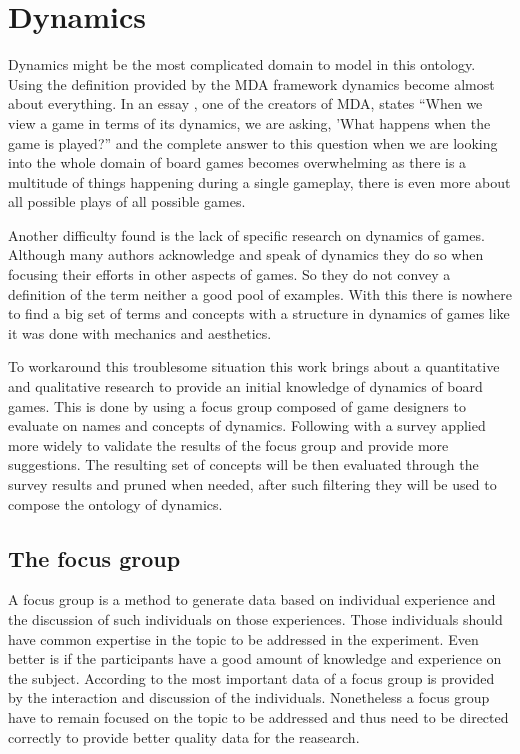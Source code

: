 \section{Dynamics}

Dynamics might be the most complicated domain to model in this ontology. Using the definition provided by the MDA framework dynamics become almost about everything. In an essay \cite{leblanc2006tools}, one of the creators of MDA, states ``When we view a game in terms of its dynamics, we are asking, 'What happens when the game is played?'' and the complete answer to this question when we are looking into the whole domain of board games becomes overwhelming as there is a multitude of things happening during a single gameplay, there is even more about all possible plays of all possible games. 

Another difficulty found is the lack of specific research on dynamics of games. Although many authors acknowledge and speak of dynamics they do so when focusing their efforts in other aspects of games. So they do not convey a definition of the term neither a good pool of examples. With this there is nowhere to find a big set of terms and concepts with a structure in dynamics of games like it was done with mechanics and aesthetics.

To workaround this troublesome situation this work brings about a quantitative and qualitative research to provide an initial knowledge of dynamics of board games. This is done by using a focus group composed of game designers to evaluate on names and concepts of dynamics. Following with a survey applied more widely to validate the results of the focus group and provide more suggestions. The resulting set of concepts will be then evaluated through the survey results and pruned when needed, after such filtering they will be used to compose the ontology of dynamics.

\subsection{The focus group}

A focus group is a method to generate data based on individual experience and the discussion of such individuals on those experiences. Those individuals should have common expertise in the topic to be addressed in the experiment. Even better is if the participants have a good amount of knowledge and experience on the subject. According to \cite{jenny_methodologyfocusgroup_1994} the most important data of a focus group is provided by the interaction and discussion of the individuals. Nonetheless a focus group have to remain focused on the topic to be addressed and thus need to be directed correctly to provide better quality data for the reasearch. \citep{liamputtong_focusgroup_2011,rabiee_focus-group_2004,jenny_methodologyfocusgroup_1994}

